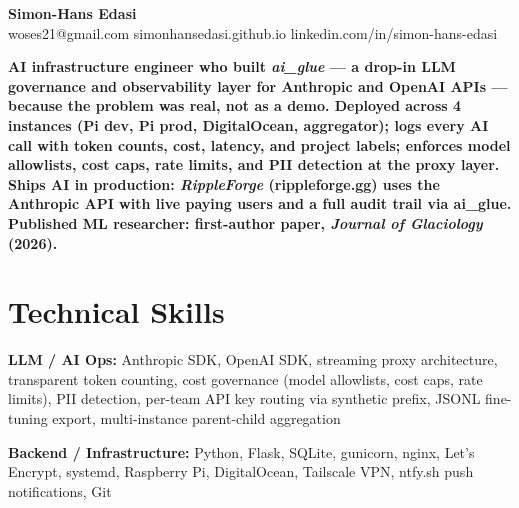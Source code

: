 \documentclass[11pt,a4paper]{article}
\begin{document}
\noindent{}

\begin{center}
    {\LARGE \textbf{Simon-Hans Edasi}} \\[6pt]
    woses21@gmail.com \hfill \textbar \hfill
    simonhansedasi.github.io \hfill \textbar \hfill
    linkedin.com/in/simon-hans-edasi
\end{center}

\vspace{0.3cm}

\noindent
\textbf{AI infrastructure engineer who built \textit{ai\_glue} --- a drop-in LLM governance and observability layer for Anthropic and OpenAI APIs --- because the problem was real, not as a demo. Deployed across 4 instances (Pi dev, Pi prod, DigitalOcean, aggregator); logs every AI call with token counts, cost, latency, and project labels; enforces model allowlists, cost caps, rate limits, and PII detection at the proxy layer. Ships AI in production: \textit{RippleForge} (rippleforge.gg) uses the Anthropic API with live paying users and a full audit trail via ai\_glue. Published ML researcher: first-author paper, \textit{Journal of Glaciology} (2026).}

\section*{Technical Skills}

\noindent
\textbf{LLM / AI Ops:} Anthropic SDK, OpenAI SDK, streaming proxy architecture, transparent token counting, cost governance (model allowlists, cost caps, rate limits), PII detection, per-team API key routing via synthetic prefix, JSONL fine-tuning export, multi-instance parent-child aggregation

\noindent
\textbf{Backend / Infrastructure:} Python, Flask, SQLite, gunicorn, nginx, Let's Encrypt, systemd, Raspberry Pi, DigitalOcean, Tailscale VPN, ntfy.sh push notifications, Git
\end{document}
